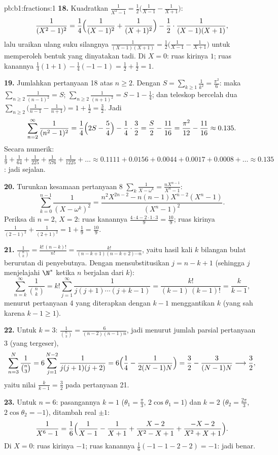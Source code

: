 \begin{solution}{pb:b1:fractions:1}
\textbf{18.} Kuadratkan $\frac1{X^2-1} = \frac12\bigl(\frac1{X-1} -
\frac1{X+1}\bigr)$:
\[
\frac1{(X^2-1)^2} = \frac14\Bigl(\frac1{(X-1)^2} +
\frac1{(X+1)^2}\Bigr) - \frac12\cdot\frac1{(X-1)(X+1)} ,
\]
lalu uraikan ulang suku silangnya $\frac1{(X-1)(X+1)} =
\frac12\bigl(\frac1{X-1} - \frac1{X+1}\bigr)$ untuk memperoleh bentuk
yang dinyatakan tadi. Di $X = 0$: ruas kirinya $1$; ruas kanannya $\frac14(1 + 1) -
\frac14(-1 - 1) = \frac12 + \frac12 = 1$.

\textbf{19.} Jumlahkan pertanyaan 18 atas $n \geq 2$. Dengan $S =
\sum_{k\geq1}\frac1{k^2} = \frac{\pi^2}6$: maka $\sum_{n\geq2}
\frac1{(n-1)^2} = S$; $\sum_{n\geq2}\frac1{(n+1)^2} = S - 1 -
\frac14$; dan teleskop bercelah dua $\sum_{n\geq2}\bigl(
\frac1{n-1} - \frac1{n+1}\bigr) = 1 + \frac12 = \frac32$. Jadi
\[
\sum_{n=2}^{\infty}\frac1{(n^2-1)^2}
= \frac14\Bigl(2S - \frac54\Bigr) - \frac14\cdot\frac32
= \frac S2 - \frac{11}{16}
= \frac{\pi^2}{12} - \frac{11}{16} \approx 0.135 .
\]
Secara numerik: $\frac19 + \frac1{64} + \frac1{225} + \frac1{576} +
\frac1{1225} + \dots \approx 0.1111 + 0.0156 + 0.0044 + 0.0017 +
0.0008 + \dots \approx 0.135$: jadi sejalan.

\textbf{20.} Turunkan kesamaan pertanyaan 8
$\sum_k\frac1{X-\omega^k} = \frac{nX^{n-1}}{X^n-1}$:
\[
\sum_{k=0}^{n-1}\frac1{(X - \omega^k)^2}
= \frac{n^2X^{2n-2} - n(n-1)X^{n-2}(X^n - 1)}{(X^n - 1)^2} .
\]
Periksa di $n = 2$, $X = 2$: ruas kanannya $\frac{4\cdot4 -
2\cdot1\cdot3}{9} = \frac{10}9$; ruas kirinya $\frac1{(2-1)^2} +
\frac1{(2+1)^2} = 1 + \frac19 = \frac{10}9$.

\textbf{21.} $\frac1{\binom nk} = \frac{k!\,(n-k)!}{n!} =
\frac{k!}{(n-k+1)(n-k+2)\cdots n}$, yaitu hasil kali $k$ bilangan bulat
berurutan di penyebutnya. Dengan mensubstitusikan $j = n - k + 1$ (sehingga $j$
menjelajahi $\N^*$ ketika $n$ berjalan dari $k$):
\[
\sum_{n=k}^{\infty}\frac1{\binom nk}
= k!\sum_{j=1}^{\infty}\frac1{j(j+1)\cdots(j+k-1)}
= \frac{k!}{(k-1)\,(k-1)!} = \frac{k}{k-1} ,
\]
menurut pertanyaan 4 yang diterapkan dengan $k - 1$ menggantikan $k$ (yang sah karena
$k - 1 \geq 1$).

\textbf{22.} Untuk $k = 3$: $\frac1{\binom n3} =
\frac6{(n-2)(n-1)n}$, jadi menurut jumlah parsial pertanyaan 3 (yang tergeser),
\[
\sum_{n=3}^{N}\frac1{\binom n3}
= 6\sum_{j=1}^{N-2}\frac1{j(j+1)(j+2)}
= 6\Bigl(\frac14 - \frac1{2(N-1)N}\Bigr)
= \frac32 - \frac3{(N-1)N}
\longrightarrow \frac32 ,
\]
yaitu nilai $\frac k{k-1} = \frac32$ pada pertanyaan 21.

\textbf{23.} Untuk $n = 6$: pasangannya $k = 1$ ($\theta_1 = \frac\pi3$,
$2\cos\theta_1 = 1$) dan $k = 2$ ($\theta_2 = \frac{2\pi}3$,
$2\cos\theta_2 = -1$), ditambah  real $\pm1$:
\[
\frac1{X^6-1} = \frac16\Bigl(\frac1{X-1} - \frac1{X+1}
+ \frac{X - 2}{X^2 - X + 1}
+ \frac{-X - 2}{X^2 + X + 1}\Bigr) .
\]
Di $X = 0$: ruas kirinya $-1$; ruas kanannya $\frac16(-1 - 1 - 2 - 2)
= -1$: jadi benar.


\end{solution}
